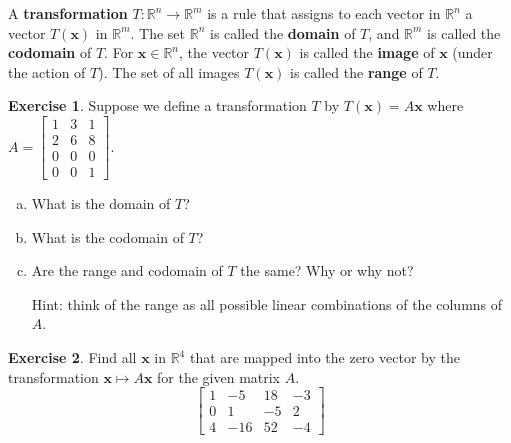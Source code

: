 \documentclass[10pt]{book}
\newcommand{\boxcolor}{gray!30}
\newenvironment{boxdef}{\begin{mdframed}[backgroundcolor=\boxcolor,linewidth=0pt,nobreak=true]}{\end{mdframed}}
\theoremstyle{definition}
\newtheorem{exercise}{Exercise}[section]
\newcommand{\R}{\mathbb{R}}
\newcommand{\vect}[1]{\ensuremath{\boldsymbol{\mathbf{#1}}}}
\newcommand{\Ax}{A\vect{x}}
\begin{document}
\begin{boxdef}
	A \textbf{transformation} $T:\R^n\to\R^m$ is a rule that assigns to each vector in $\R^n$ a vector $T(\vect{x})$ in $\R^m$. The set $\R^n$ is called the \textbf{domain} of $T$, and $\R^m$ is called the \textbf{codomain} of $T$. For $\vect{x}\in\R^n$, the vector $T(\vect{x})$ is called the \textbf{image} of $\vect{x}$ (under the action of $T$). The set of all images $T(\vect{x})$ is called the \textbf{range} of $T$.
\end{boxdef}

\begin{exercise} %
	Suppose we define a transformation $T$ by $T(\vect{x})=\Ax$ where $A=\begin{bmatrix}1&3&1\\2&6&8\\0&0&0\\0&0&1\end{bmatrix}$.
	\begin{enumerate}[(a)]
		\item What is the domain of $T$?
		\vspace{1em}
		\item What is the codomain of $T$?
		\vspace{1em}
		\item Are the range and codomain of $T$ the same? Why or why not? \par
		Hint: think of the range as all possible linear combinations of the columns of $A$.
	\end{enumerate}
\end{exercise}
\vfill



\begin{exercise} %
	Find all $\vect{x}$ in $\R^4$ that are mapped into the zero vector by the transformation $\vect{x}\mapsto\Ax$ for the given matrix $A$.
	$$ \begin{bmatrix} 1&-5&18&-3 \\ 0&1&-5&2 \\ 4&-16&52&-4 \end{bmatrix}$$
\end{exercise}
\vfill
\end{document}
